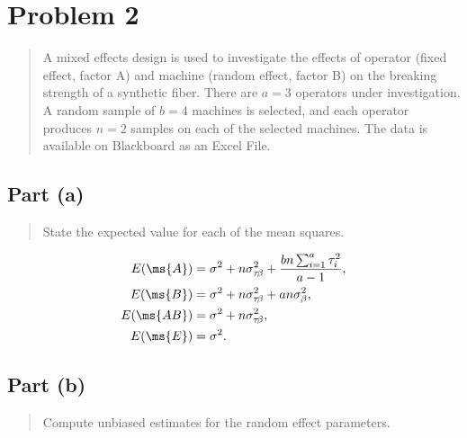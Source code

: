 \documentclass[
]{article}
\newenvironment{Shaded}{\begin{snugshade}}{\end{snugshade}}
\newcommand{\FunctionTok}[1]{\textcolor[rgb]{0.13,0.29,0.53}{\textbf{#1}}}
\newcommand{\NormalTok}[1]{#1}
\newcommand{\OtherTok}[1]{\textcolor[rgb]{0.56,0.35,0.01}{#1}}
\newcommand{\SpecialCharTok}[1]{\textcolor[rgb]{0.81,0.36,0.00}{\textbf{#1}}}
\begin{document}
\hypertarget{problem-2}{%
\section{Problem 2}\label{problem-2}}

\begin{quote}
A mixed effects design is used to investigate the effects of operator
(fixed effect, factor A) and machine (random effect, factor B) on the
breaking strength of a synthetic fiber. There are \(a=3\) operators
under investigation. A random sample of \(b=4\) machines is selected,
and each operator produces \(n=2\) samples on each of the selected
machines. The data is available on Blackboard as an Excel File.
\end{quote}

\hypertarget{part-a-1}{%
\subsection{Part (a)}\label{part-a-1}}

\begin{quote}
State the expected value for each of the mean squares.
\end{quote}

\begin{align*}
  E(\ms{A}) &= \sigma^2 + n \sigma_{\tau \! \beta}^2 +
    \frac{b n \sum_{i=1}^{a}\tau_i^2}{a-1},\\
  E(\ms{B}) &= \sigma^2 + n \sigma_{\tau \! \beta}^2 + a n \sigma_{\beta}^2,\\
  E(\ms{A B}) &= \sigma^2 + n \sigma_{\tau \! \beta}^2,\\
  E(\ms{E}) &= \sigma^2.
\end{align*}

\hypertarget{part-b-1}{%
\subsection{Part (b)}\label{part-b-1}}

\begin{quote}
Compute unbiased estimates for the random effect parameters.
\end{quote}

\begin{Shaded}
\end{Shaded}
\end{document}
